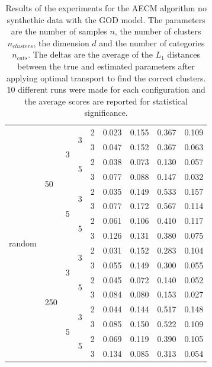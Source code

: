 \begin{table}[H]
\begin{minipage}{.48\columnwidth}
\begin{adjustbox}{width=\columnwidth}
\begin{tabular}{lllllrrrr}
\cline{1-9} \cline{2-9} \cline{3-9} \cline{4-9}
\multirow[t]{16}{*}{random} & \multirow[t]{8}{*}{50} & \multirow[t]{4}{*}{3} & \multirow[t]{2}{*}{3} & 2 & 0.023 & 0.155 & 0.367 & 0.109 \\
 &  &  &  & 3 & 0.047 & 0.152 & 0.367 & 0.063 \\
\cline{4-9}
 &  &  & \multirow[t]{2}{*}{5} & 2 & 0.038 & 0.073 & 0.130 & 0.057 \\
 &  &  &  & 3 & 0.077 & 0.088 & 0.147 & 0.032 \\
\cline{3-9} \cline{4-9}
 &  & \multirow[t]{4}{*}{5} & \multirow[t]{2}{*}{3} & 2 & 0.035 & 0.149 & 0.533 & 0.157 \\
 &  &  &  & 3 & 0.077 & 0.172 & 0.567 & 0.114 \\
\cline{4-9}
 &  &  & \multirow[t]{2}{*}{5} & 2 & 0.061 & 0.106 & 0.410 & 0.117 \\
 &  &  &  & 3 & 0.126 & 0.131 & 0.380 & 0.075 \\
\cline{2-9} \cline{3-9} \cline{4-9}
 & \multirow[t]{8}{*}{250} & \multirow[t]{4}{*}{3} & \multirow[t]{2}{*}{3} & 2 & 0.031 & 0.152 & 0.283 & 0.104 \\
 &  &  &  & 3 & 0.055 & 0.149 & 0.300 & 0.055 \\
\cline{4-9}
 &  &  & \multirow[t]{2}{*}{5} & 2 & 0.045 & 0.072 & 0.140 & 0.052 \\
 &  &  &  & 3 & 0.084 & 0.080 & 0.153 & 0.027 \\
\cline{3-9} \cline{4-9}
 &  & \multirow[t]{4}{*}{5} & \multirow[t]{2}{*}{3} & 2 & 0.044 & 0.144 & 0.517 & 0.148 \\
 &  &  &  & 3 & 0.085 & 0.150 & 0.522 & 0.109 \\
\cline{4-9}
 &  &  & \multirow[t]{2}{*}{5} & 2 & 0.069 & 0.119 & 0.390 & 0.105 \\
 &  &  &  & 3 & 0.134 & 0.085 & 0.313 & 0.054 \\
\cline{1-9} \cline{2-9} \cline{3-9} \cline{4-9}
\bottomrule
\end{tabular}
\end{adjustbox}
\caption{Results of the experiments for the AECM algorithm no synthethic data with the GOD model. The parameters are the number of samples $n$, the number of clusters $n_{clusters}$, the dimension $d$ and the number of categories $n_{cats}$. The deltas are the average of the $L_1$ distances between the true and estimated parameters after applying optimal transport to find the correct clusters. 10 different runs were made for each configuration and the average scores are reported for statistical significance.}

\end{minipage}
\end{table}
